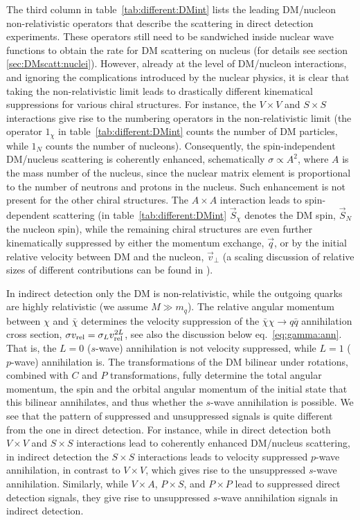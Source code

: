 \smallskip

The third column in table~\ref{tab:different:DMint}  lists the leading DM/nucleon non-relativistic operators that describe the scattering in direct detection experiments. These operators still need to be sandwiched inside nuclear wave functions to obtain the rate for DM scattering on nucleus (for details see section \ref{sec:DMscatt:nuclei}). However, already at the level of DM/nucleon interactions, and ignoring the complications introduced by the nuclear physics, it is clear that taking the non-relativistic limit leads to drastically different kinematical suppressions for various chiral structures. For instance, the $V\times V$ and $S\times S$ interactions give rise to the numbering operators in the non-relativistic limit (the  operator $1_\chi$ in table~\ref{tab:different:DMint}  counts the number of DM particles, while $1_N$ counts the number of nucleons).  Consequently, the spin-independent DM/nucleus scattering is coherently enhanced, schematically $\sigma \propto A^2$, where $A$ is the mass number of the nucleus, since the nuclear matrix element is proportional to the number of neutrons and protons in the nucleus.
Such enhancement is not present for the other chiral structures. The $A\times A$ interaction leads to spin-dependent scattering (in table~\ref{tab:different:DMint} $\vec S_\chi$ denotes the DM spin, $\vec S_N$ the nucleon spin), while the remaining chiral structures are even further kinematically suppressed by either the momentum exchange, $\vec q$, or by the initial relative velocity between DM and the nucleon, $\vec v_\perp$ (a scaling discussion of relative sizes of different contributions can be found in \cite{1809.03506}). 

\smallskip

In indirect detection only the DM is non-relativistic, while the outgoing quarks are highly relativistic (we assume $M \gg m_q$). The relative angular momentum between $\chi$ and $\bar \chi$ determines the velocity suppression of the $\bar \chi \chi \to q\bar q$ annihilation  cross section, $\sigma v_{\rm rel}=\sigma_L v_{\rm rel}^{2L}$, see also the discussion below eq.~\eqref{eq:gamma:ann}. That is, the $L=0$ ($s$-wave) annihilation is not velocity suppressed, while $L=1$ ($p$-wave) annihilation is.  The transformations of the DM bilinear under rotations, combined with $C$ and $P$ transformations, fully determine the total angular momentum, the spin and the orbital angular momentum of the initial state that this bilinear annihilates, and thus whether the $s$-wave annihilation is possible. We see that the pattern of suppressed and unsuppressed signals is quite different from the one in direct detection. For instance, while in direct detection both $V\times V$ and $S\times S$ interactions lead to coherently enhanced DM/nucleus scattering, in indirect detection the $S\times S$ interactions leads to velocity suppressed $p$-wave annihilation, in contrast to $V\times V$, which gives rise to the unsuppressed $s$-wave annihilation. Similarly, while $V\times A$, $P\times S$, and $P\times P$ lead to suppressed direct detection signals, they give rise to unsuppressed $s$-wave annihilation signals in indirect detection. 

